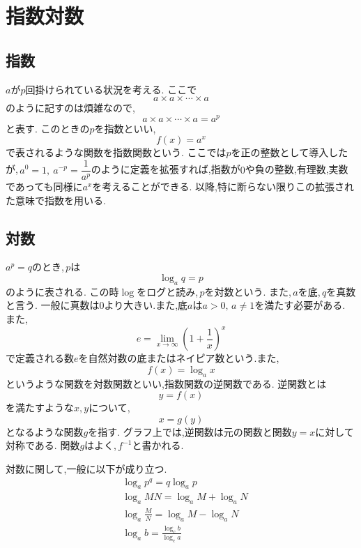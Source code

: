
  \section{指数対数}
    \subsection{指数}
      $a$が$p$回掛けられている状況を考える.
      ここで
      \[
        a\times a\times\cdots\times a
      \]
      のように記すのは煩雑なので,
      \[
        a\times a\times\cdots\times a=a^p
      \]
      と表す.
      このときの$p$を指数といい,
      \[
        f(x)=a^x
      \]
      で表されるような関数を指数関数という.
      ここでは$p$を正の整数として導入したが,\,$a^0=1,\ a^{-p}=\dfrac1{a^p}$のように定義を拡張すれば,指数が$0$や負の整数,有理数,実数であっても同様に$a^x$を考えることができる.
      以降,特に断らない限りこの拡張された意味で指数を用いる.
    \subsection{対数}
      $a^p=q$のとき,\,$p$は
      \[
        \log_a{q}=p
      \]
      のように表される.
      この時$\log$をログと読み,\,$p$を対数という.
      また,\,$a$を底,\,$q$を真数と言う.
      一般に真数は0より大きい.また,底$a$は$a>0,\,a\ne1$を満たす必要がある.
      また,
      \[
        e=\lim_{x \to \infty} \left(1+\frac{1}{x}\right)^x
      \]
      で定義される数$e$を自然対数の底またはネイピア数という.また,
      \[
        f(x)=\log_a x
      \]
      というような関数を対数関数といい,指数関数の逆関数である.
      逆関数とは
      \[
        y=f(x)
      \]
      を満たすような$x,y$について,
      \[
        x=g(y)
      \]
      となるような関数$g$を指す.
      グラフ上では,逆関数は元の関数と関数$y=x$に対して対称である.
      関数$g$はよく,\,$f^{-1}$と書かれる.

      対数に関して,一般に以下が成り立つ.
      \begin{align*}
        &\log_a{p^q}=q\log_a{p}\\
        &\log_a{MN}=\log_a{M}+\log_a{N}\\
        &\log_a{\frac{M}{N}}=\log_a{M}-\log_a{N}\\
        &\log_a{b}=\frac{\log_c{b}}{\log_c{a}}
      \end{align*}
    
